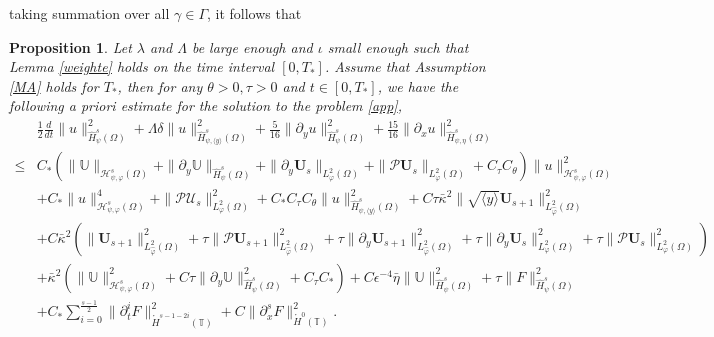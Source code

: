 \documentclass{amsart}
\numberwithin{equation}{section}
\newtheorem{prop}{Proposition}[section]
\newcommand\y{{{\langle y \rangle}}}
\begin{document}
taking summation over all $\gamma\in\Gamma$, it follows that
\begin{prop}\label{lowe}
Let $\lambda$ and $\Lambda$ be large enough and $\iota$ small enough such that Lemma \ref{weighte} holds on the time interval $[0,T_{*}]$. Assume that Assumption \ref{MA} holds for $T_{*}$, then for any $\theta>0, \tau>0$ and $t\in[0,T_{*}]$, we have the following a priori estimate for the solution to the problem \eqref{app},
\begin{align}\label{le'}
&\frac{1}{2}\frac{d}{dt}\|u\|_{\hat{H}_{\psi}^{s}(\Omega)}^{2}
+\Lambda\delta\|u\|_{\hat{H}_{\psi,\y}^{s}(\Omega)}^{2}
+\frac{5}{16}\|\partial_{y}u\|_{\hat{H}_{\psi}^{s}(\Omega)}^{2}
+\frac{15}{16}\|\partial_{x}u\|_{\hat{H}_{\psi,\eta}^{s}(\Omega)}^{2}\\
\leq& C_{*}\left(\|\mathbb{U}\|_{\mathcal{H}_{\psi,\varphi}^{s}(\Omega)}
                +\|\partial_{y}\mathbb{U}\|_{\hat{H}_{\psi}^{s}(\Omega)}
                +\|\partial_{y}\mathbf{U}_{s}\|_{L_{\varphi}^{2}(\Omega)}
                +\|\mathcal{P}\mathbf{U}_{s}\|_{L_{\varphi}^{2}(\Omega)}
                +C_{\tau}C_{\theta}\right)
          \|u\|_{\mathcal{H}_{\psi,\varphi}^{s}(\Omega)}^{2}\nonumber\\
    &+C_{*}\|u\|_{\mathcal{H}_{\psi,\varphi}^{s}(\Omega)}^{4}
     +\|\mathcal{P}\mathcal{U}_{s}\|_{L_{\varphi}^{2}(\Omega)}^{2}
     +C_{*}C_{\tau}C_{\theta}\|u\|_{\hat{H}_{\psi,\y}^{s}(\Omega)}^{2}
     +C\tau\bar{\kappa}^{2}\|\sqrt{\y}\mathbf{U}_{s+1}\|_{L_{\hat{\varphi}}^{2}(\Omega)}^{2}\nonumber\\
    &+C\bar{\kappa}^{2}\left(\|\mathbf{U}_{s+1}\|_{L_{\hat{\varphi}}^{2}(\Omega)}^{2}
                     +\tau\|\mathcal{P}\mathbf{U}_{s+1}\|_{L_{\hat{\varphi}}^{2}(\Omega)}^{2}
                     +\tau\|\partial_{y}\mathbf{U}_{s+1}\|_{L_{\hat{\varphi}}^{2}(\Omega)}^{2}
                     +\tau\|\partial_{y}\mathbf{U}_{s}\|_{L_{\varphi}^{2}(\Omega)}^{2}
                     +\tau\|\mathcal{P}\mathbf{U}_{s}\|_{L_{\varphi}^{2}(\Omega)}^{2}\right)\nonumber\\
    &+\bar{\kappa}^{2}\left(\|\mathbb{U}\|_{\mathcal{H}_{\psi,\varphi}^{s}(\Omega)}^{2}
                +C\tau\|\partial_{y}\mathbb{U}\|_{\hat{H}_{\psi}^{s}(\Omega)}^{2}
                +C_{\tau}C_{*}\right)
     +C\epsilon^{-4}\bar{\eta}\|\mathbb{U}\|_{\hat{H}_{\psi}^{s}(\Omega)}^{2}
     +\tau\|F\|_{\hat{H}_{\psi}^{s}(\Omega)}^{2}\nonumber\\
    &+C_{*}\sum_{i=0}^{\frac{s-1}{2}}\|\partial_{t}^{i}F\|_{\mathring{H}^{s-1-2i}(\mathbb{T})}^{2}
     +C\|\partial_{x}^{s}F\|_{\mathring{H}^{0}(\mathbb{T})}^{2}.\nonumber
\end{align}
\end{prop}
\end{document}
